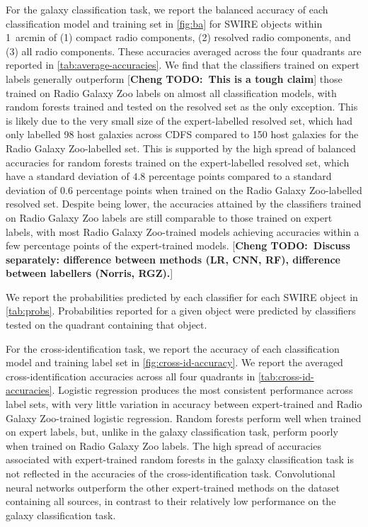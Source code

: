 \documentclass[fleqn,usenatbib,usedcolumn]{mnras}
\newcommand{\cheng}[1]{ {\color{teal}[{\bf Cheng TODO:~{#1}}]} }
\begin{document}
    For the galaxy classification task, we report the balanced accuracy of
    each classification model and training set in \autoref{fig:ba} for SWIRE
    objects within 1~arcmin of (1) compact radio components, (2) resolved
    radio components, and (3) all radio components. These accuracies averaged
    across the four quadrants are reported in
    \autoref{tab:average-accuracies}. We find that the classifiers trained on
    expert labels generally outperform \cheng{This is a tough claim} those trained on Radio Galaxy Zoo
    labels on almost all classification models, with random forests trained
    and tested on the resolved set as the only exception. This is likely due
    to the very small size of the expert-labelled resolved set, which had only
    labelled 98 host galaxies across CDFS compared to 150 host galaxies for
    the Radio Galaxy Zoo-labelled set. This is supported by the high spread of
    balanced accuracies for random forests trained on the expert-labelled
    resolved set, which have a standard deviation of $4.8$ percentage points
    compared to a standard deviation of $0.6$ percentage points when trained
    on the Radio Galaxy Zoo-labelled resolved set. Despite being lower, the
    accuracies attained by the classifiers trained on Radio Galaxy Zoo labels
    are still comparable to those trained on expert labels, with most Radio
    Galaxy Zoo-trained models achieving accuracies within a few percentage
    points of the expert-trained models.
    \cheng{Discuss separately: difference between methods (LR, CNN, RF),
    difference between labellers (Norris, RGZ).}

    We report the probabilities predicted by each classifier for each SWIRE
    object in \autoref{tab:probs}. Probabilities reported for a given object
    were predicted by classifiers tested on the quadrant containing that
    object.

    For the cross-identification task, we report the accuracy of each
    classification model and training label set in
    \autoref{fig:cross-id-accuracy}. We report the averaged
    cross-identification accuracies across all four quadrants in
    \autoref{tab:cross-id-accuracies}. Logistic regression produces the most
    consistent performance across label sets, with very little variation in
    accuracy between expert-trained and Radio Galaxy Zoo-trained logistic
    regression. Random forests perform well when trained on expert labels,
    but, unlike in the galaxy classification task, perform poorly when trained
    on Radio Galaxy Zoo labels. The high spread of accuracies associated with
    expert-trained random forests in the galaxy classification task is not
    reflected in the accuracies of the cross-identification task.
    Convolutional neural networks outperform the other expert-trained methods
    on the dataset containing all sources, in contrast to their relatively low
    performance on the galaxy classification task.
\end{document}
